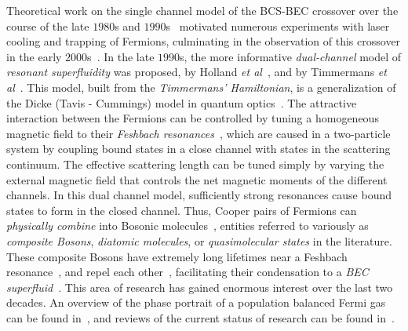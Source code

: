 \documentclass[a4paper,10pt]{article}
\begin{document}
Theoretical work on the single channel model of the BCS-BEC crossover over the course of the late $1980$s and $1990$s~\cite{springerlink:10.1007/BF00683774,randeria:fermigas,randeria:bcsbec3,randeria:bcsbec2d,dreschler:bcsbec} motivated numerous experiments with laser cooling and trapping of Fermions, culminating in the observation of this crossover in the early $2000$s~\cite{zwierlein:bcsbecexpt,thomas:superfluid,fermionic:cond:K, collective1}. In the late $1990$s, the more informative \textit{dual-channel} model of \textit{resonant superfluidity} was proposed, by Holland \textit{et al}~\cite{holland:bcsbec}, and by Timmermans \textit{et al}~\cite{timmermans}. This model, built from the \textit{Timmermans' Hamiltonian}, is a generalization of the Dicke (Tavis - Cummings) model in quantum optics~\cite{yuzbashyan}. The attractive interaction between the Fermions can be controlled by tuning a homogeneous magnetic field to their \textit{Feshbach resonances}~\cite{timmermans}, which are caused in a two-particle system  by coupling bound states in a close channel with states in the scattering continuum. The effective scattering length can be tuned simply by varying the external magnetic field that controls the net magnetic moments of the different channels. In this dual channel model, sufficiently strong resonances cause bound states to form in the closed channel. Thus, Cooper pairs of Fermions can \textit{physically combine} into Bosonic molecules~\cite{bcsbec:ohashi}, entities referred to variously as \textit{composite Bosons}, \textit{diatomic molecules}, or \textit{quasimolecular states} in the literature. These composite Bosons have extremely long lifetimes near a Feshbach resonance~\cite{cubizolles:feshbachlife1,strecker:feshbachlife2}, and repel each other~\cite{petrov:repulsivebosons}, facilitating their condensation to a \textit{BEC superfluid}~\cite{donley:becquench,bourdel}. This area of research has gained enormous interest over the last two decades. An overview of the phase portrait of a population balanced Fermi gas can be found in~\cite{randeria:bcsbecnature}, and reviews of the current status of research can be found in~\cite{stringari:review,bloch:review}. 
\end{document}
